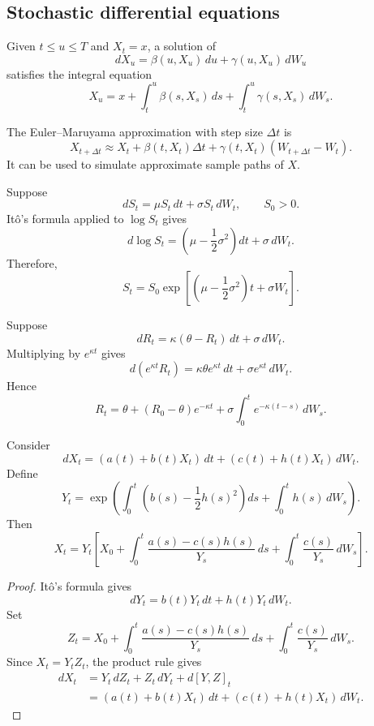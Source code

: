 \subsection{Stochastic differential equations}

\begin{de}
Given $t\leq u\leq T$ and $X_t=x$, a solution of
\[
dX_u=\beta(u,X_u)\,du+\gamma(u,X_u)\,dW_u
\]
satisfies the integral equation
\[
X_u
=
x+
\int_t^u\beta(s,X_s)\,ds+
\int_t^u\gamma(s,X_s)\,dW_s.
\]
\end{de}

\begin{remark}
The Euler--Maruyama approximation with step size $\Delta t$ is
\[
X_{t+\Delta t}
\approx
X_t+
\beta(t,X_t)\Delta t+
\gamma(t,X_t)(W_{t+\Delta t}-W_t).
\]
It can be used to simulate approximate sample paths of $X$.
\end{remark}

\begin{eg}
Suppose
\[
dS_t=\mu S_t\,dt+\sigma S_t\,dW_t,
\qquad S_0>0.
\]
It\^o's formula applied to $\log S_t$ gives
\[
d\log S_t
=
\left(\mu-\frac12\sigma^2\right)dt+
\sigma\,dW_t.
\]
Therefore,
\[
S_t
=
S_0\exp\left[
\left(\mu-\frac12\sigma^2\right)t+
\sigma W_t
\right].
\]
\end{eg}

\begin{eg}
Suppose
\[
dR_t=\kappa(\theta-R_t)\,dt+\sigma\,dW_t.
\]
Multiplying by $e^{\kappa t}$ gives
\[
d(e^{\kappa t}R_t)
=
\kappa\theta e^{\kappa t}\,dt+
\sigma e^{\kappa t}\,dW_t.
\]
Hence
\[
R_t
=
\theta+(R_0-\theta)e^{-\kappa t}
+
\sigma\int_0^t e^{-\kappa(t-s)}\,dW_s.
\]
\end{eg}

\begin{eg}
Consider
\[
dX_t
=
(a(t)+b(t)X_t)\,dt+
(c(t)+h(t)X_t)\,dW_t.
\]
Define
\[
Y_t
=
\exp\left(
\int_0^t\left(b(s)-\frac12h(s)^2\right)ds
+
\int_0^t h(s)\,dW_s
\right).
\]
Then
\[
X_t
=
Y_t\left[
X_0+
\int_0^t\frac{a(s)-c(s)h(s)}{Y_s}\,ds
+
\int_0^t\frac{c(s)}{Y_s}\,dW_s
\right].
\]
\end{eg}

\begin{proof}
It\^o's formula gives
\[
dY_t=b(t)Y_t\,dt+h(t)Y_t\,dW_t.
\]
Set
\[
Z_t
=
X_0+
\int_0^t\frac{a(s)-c(s)h(s)}{Y_s}\,ds
+
\int_0^t\frac{c(s)}{Y_s}\,dW_s.
\]
Since $X_t=Y_tZ_t$, the product rule gives
\[
\begin{aligned}
dX_t
&=Y_t\,dZ_t+Z_t\,dY_t+d[Y,Z]_t\\
&=(a(t)+b(t)X_t)\,dt
+(c(t)+h(t)X_t)\,dW_t.
\end{aligned}
\]
\end{proof}

